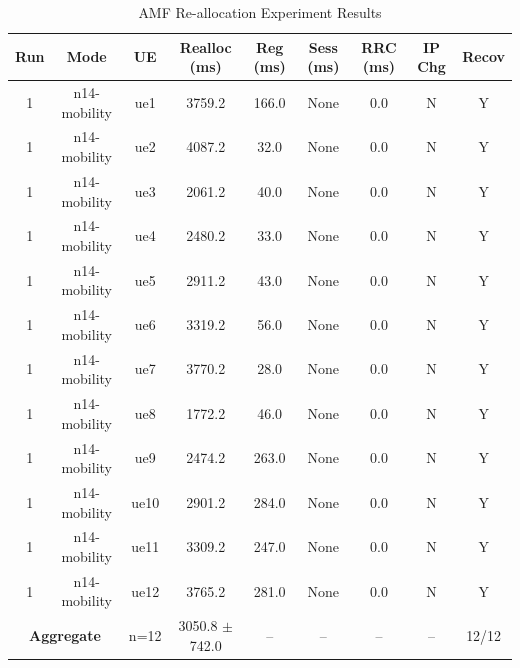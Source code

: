 \begin{table}[ht]
\centering
\begin{tabular}{|c|c|c|c|c|c|c|c|c|}
\hline
Run & Mode & UE & Realloc (ms) & Reg (ms) & Sess (ms) & RRC (ms) & IP Chg & Recov \\
\hline
1 & n14-mobility & ue1 & 3759.2 & 166.0 & None & 0.0 & N & Y \\
1 & n14-mobility & ue2 & 4087.2 & 32.0 & None & 0.0 & N & Y \\
1 & n14-mobility & ue3 & 2061.2 & 40.0 & None & 0.0 & N & Y \\
1 & n14-mobility & ue4 & 2480.2 & 33.0 & None & 0.0 & N & Y \\
1 & n14-mobility & ue5 & 2911.2 & 43.0 & None & 0.0 & N & Y \\
1 & n14-mobility & ue6 & 3319.2 & 56.0 & None & 0.0 & N & Y \\
1 & n14-mobility & ue7 & 3770.2 & 28.0 & None & 0.0 & N & Y \\
1 & n14-mobility & ue8 & 1772.2 & 46.0 & None & 0.0 & N & Y \\
1 & n14-mobility & ue9 & 2474.2 & 263.0 & None & 0.0 & N & Y \\
1 & n14-mobility & ue10 & 2901.2 & 284.0 & None & 0.0 & N & Y \\
1 & n14-mobility & ue11 & 3309.2 & 247.0 & None & 0.0 & N & Y \\
1 & n14-mobility & ue12 & 3765.2 & 281.0 & None & 0.0 & N & Y \\
\multicolumn{2}{|c|}{\textbf{Aggregate}} & n=12 & 3050.8 $\pm$ 742.0 & -- & -- & -- & -- & 12/12 \\
\hline
\end{tabular}
\caption{AMF Re-allocation Experiment Results}
\label{tab:amf_realloc}
\end{table}
